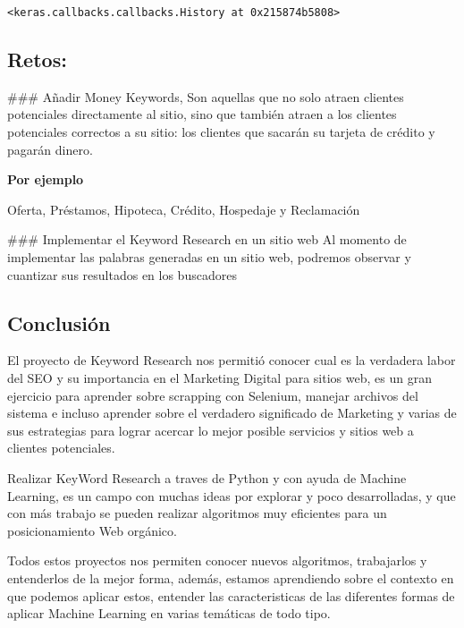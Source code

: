 \documentclass[11pt]{article}
\makeatletter
\newcommand{\boxspacing}{\kern\kvtcb@left@rule\kern\kvtcb@boxsep}
\newcommand{\prompt}[4]{
        \ttfamily\llap{{\color{#2}[#3]:\hspace{3pt}#4}}\vspace{-\baselineskip}
    }
\makeatother
\begin{document}
            \begin{tcolorbox}[breakable, size=fbox, boxrule=.5pt, pad at break*=1mm, opacityfill=0]
\prompt{Out}{outcolor}{51}{\boxspacing}
\begin{Verbatim}[commandchars=\\\{\}]
<keras.callbacks.callbacks.History at 0x215874b5808>
\end{Verbatim}
\end{tcolorbox}
        
    \hypertarget{retos}{%
\subsection{Retos:}\label{retos}}

\#\#\# Añadir Money Keywords, Son aquellas que no solo atraen clientes
potenciales directamente al sitio, sino que también atraen a los
clientes potenciales correctos a su sitio: los clientes que sacarán su
tarjeta de crédito y pagarán dinero.

\textbf{Por ejemplo}

Oferta, Préstamos, Hipoteca, Crédito, Hospedaje y Reclamación

\#\#\# Implementar el Keyword Research en un sitio web Al momento de
implementar las palabras generadas en un sitio web, podremos observar y
cuantizar sus resultados en los buscadores

    \hypertarget{conclusiuxf3n}{%
\subsection{Conclusión}\label{conclusiuxf3n}}

El proyecto de Keyword Research nos permitió conocer cual es la
verdadera labor del SEO y su importancia en el Marketing Digital para
sitios web, es un gran ejercicio para aprender sobre scrapping con
Selenium, manejar archivos del sistema e incluso aprender sobre el
verdadero significado de Marketing y varias de sus estrategias para
lograr acercar lo mejor posible servicios y sitios web a clientes
potenciales.

Realizar KeyWord Research a traves de Python y con ayuda de Machine
Learning, es un campo con muchas ideas por explorar y poco
desarrolladas, y que con más trabajo se pueden realizar algoritmos muy
eficientes para un posicionamiento Web orgánico.

Todos estos proyectos nos permiten conocer nuevos algoritmos,
trabajarlos y entenderlos de la mejor forma, además, estamos aprendiendo
sobre el contexto en que podemos aplicar estos, entender las
caracteristicas de las diferentes formas de aplicar Machine Learning en
varias temáticas de todo tipo.


    
    
    
\end{document}
